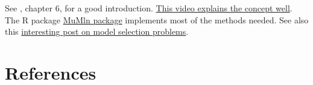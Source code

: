 \documentclass[]{article}
\begin{document}
See \citet{mcelreath2016rethinking}, chapter 6, for a good introduction.
\href{https://www.youtube.com/watch?v=LQb7l5IfS0s}{This video explains the concept well}.
The R package
\href{https://cran.r-project.org/web/packages/MuMIn/index.html}{MuMln package}
implements most of the methods needed. See also this
\href{https://www.r-bloggers.com/model-selection-and-multi-model-inference/}{interesting post on model selection problems}.

\hypertarget{references}{%
\section*{References}\label{references}}


\end{document}
